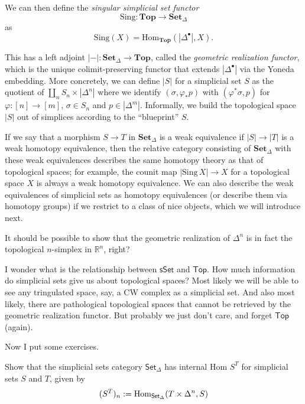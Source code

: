 We can then define the \emph{singular
simplicial set functor}
\[
\mathrm{Sing}: \mathbf{Top} \to
\mathbf{Set}_\Delta
\]
as
\[
\mathrm{Sing}(X) =
\mathrm{Hom}_{\mathbf{Top}}(|\Delta^\bullet|,
X).
\]

This has a left adjoint $|-|:
\mathbf{Set}_\Delta \to \mathbf{Top}$, called
the
\emph{geometric realization functor}, which
is the unique colimit-preserving functor
that extends $|\Delta^\bullet|$ via the
Yoneda embedding. More concretely,
we can define $|S|$ for a simplicial set $S$
as the quotient of
$\coprod_n S_n \times |\Delta^n|$ where we
identify $(\sigma,\varphi_*p)$ with
$(\varphi^*\sigma,p)$ for
$\varphi:[n]\to[m]$, $\sigma \in S_n$ and $p
\in |\Delta^m|$.
Informally, we build the topological space
$|S|$ out of simplices according to
the ``blueprint'' $S$.

If we say that a morphism $S \to T$ in
$\mathbf{Set}_\Delta$ is a weak equivalence
if
$|S| \to |T|$ is a weak homotopy equivalence,
then the relative category consisting
of $\mathbf{Set}_\Delta$ with these weak
equivalences describes the same homotopy
theory as that of topological spaces; for
example, the counit map $|\mathrm{Sing}\,X|
\to X$
for a topological space $X$ is always a weak
homotopy equivalence.
We can also describe the weak equivalences of
simplicial sets as homotopy equivalences
(or describe them via homotopy groups) if we
restrict to a class of nice objects,
which we will introduce next.

\begin{exercise}
\label{exercise-simpl-n-simpl-topol-n-simp}
It should be possible to show that
the geometric realization of $\Delta^n$ is in
fact
the topological $n$-simplex in
$\mathbb{R}^n$, right?
\end{exercise}

\noindent
I wonder what is the relationship between
$\mathsf{sSet}$ and $\mathsf{Top}$.
How much information do simplicial sets give
us about topological spaces?
Most likely we will be able to see any
tringulated
space, say, a CW complex as a simplicial set.
And also most likely, there are pathological
topological spaces that cannot be retrieved
by
the geometric realization functor.
But probably we just don't care, and forget
$\mathsf{Top}$
(again).

\medskip\noindent
Now I put some exercises.

\begin{exercise}[Observation 1.4.7]
\label{exercise-simpl-sets-categ-has-inter}
Show that the simplicial sets category
$\mathsf{Set}_\Delta$ has internal
Hom $S^T$ for simplicial sets $S$ and $T$,
given by
$$
(S^T)_n:=\mathop{\mathrm{Hom}}\nolimits_{\mathsf{Set}_\Delta}
(T\times\Delta^n,S)
$$
\end{exercise}

